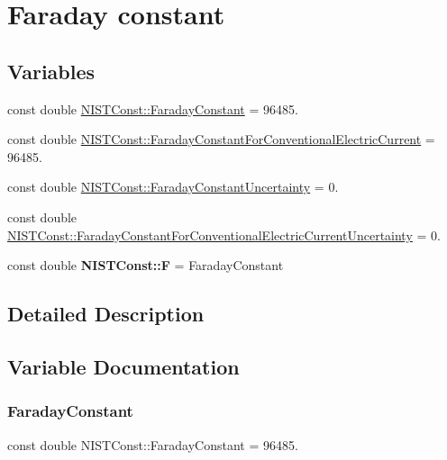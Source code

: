 \hypertarget{group___faraday_constant}{}\section{Faraday constant}
\label{group___faraday_constant}
\subsection*{Variables}
\begin{DoxyCompactItemize}
\item 
const double \hyperlink{group___faraday_constant_ga3a2104c5d85a6e687d615ec8004aa4c5}{N\+I\+S\+T\+Const\+::\+Faraday\+Constant} = 96485.
\item 
const double \hyperlink{group___faraday_constant_ga06079db2ebfcb103460b80a977171ac0}{N\+I\+S\+T\+Const\+::\+Faraday\+Constant\+For\+Conventional\+Electric\+Current} = 96485.
\item 
const double \hyperlink{group___faraday_constant_ga9b0f9181caac73b346e91602673272c1}{N\+I\+S\+T\+Const\+::\+Faraday\+Constant\+Uncertainty} = 0.
\item 
const double \hyperlink{group___faraday_constant_ga3b9280c2cf0f28e5ec6122b2f585eb81}{N\+I\+S\+T\+Const\+::\+Faraday\+Constant\+For\+Conventional\+Electric\+Current\+Uncertainty} = 0.
\item 
\mbox{\label{group___faraday_constant_ga16166b57bc4bad7a648fbbc660ab88eb}} 
const double {\bfseries N\+I\+S\+T\+Const\+::F} = Faraday\+Constant
\end{DoxyCompactItemize}


\subsection{Detailed Description}


\subsection{Variable Documentation}
\mbox{\label{group___faraday_constant_ga3a2104c5d85a6e687d615ec8004aa4c5}} 
\subsubsection{\texorpdfstring{Faraday\+Constant}{FaradayConstant}}
{\footnotesize\ttfamily const double N\+I\+S\+T\+Const\+::\+Faraday\+Constant = 96485.}

